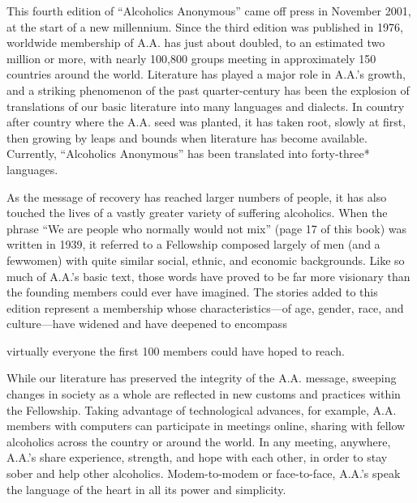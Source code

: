 This fourth edition of “Alcoholics Anonymous” came off press in November 2001, at the start of a new millennium. Since the third edition was published in 1976, worldwide membership of A.A. has just about doubled, to an estimated two million or more, with nearly 100,800 groups meeting in approximately 150 countries around the world. 
Literature has played a major role in A.A.’s growth, and a striking phenomenon of the past quarter-century has been the explosion of translations of our basic literature into many languages and dialects. 
In country after country where the A.A. seed was planted, it has taken root, slowly at ﬁrst, then growing by leaps and bounds when literature has become available. 
Currently, “Alcoholics Anonymous” has been translated into forty-three* languages.

As the message of recovery has reached larger numbers of people, it has also touched the lives of a vastly greater variety of suffering alcoholics. 
When the phrase “We are people who normally would not mix” (page 17 of this book) was written in 1939, it referred to a Fellowship composed largely of men (and a fewwomen) with quite similar social, ethnic, and economic backgrounds. 
Like so much of A.A.’s basic text, those words have proved to be far more visionary than the founding members could ever have imagined. 
The stories added to this edition represent a membership whose characteristics—of age, gender, race, and culture—have widened and have deepened to encompass

virtually everyone the first 100 members could have hoped to reach.

While our literature has preserved the integrity of the A.A. message, sweeping changes in society as a whole are reﬂected in new customs and practices within the Fellowship. 
Taking advantage of technological advances, for example, A.A. members with computers can participate in meetings online, sharing with fellow alcoholics across the country or around the world. 
In any meeting, anywhere, A.A.’s share experience, strength, and hope with each other, in order to stay sober and help other alcoholics. 
Modem-to-modem or face-to-face, A.A.’s speak the language of the heart in all its power and simplicity.


